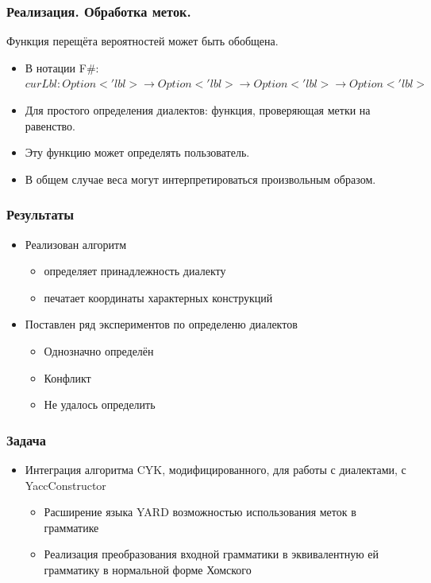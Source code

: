 \documentclass{beamer}
\begin{document}
\begin{frame}
	\transwipe[direction=90]
	\frametitle{Реализация. Обработка меток.}
	Функция перещёта вероятностей может быть обобщена.
	\begin{itemize}
	    \item В нотации F\#: $curLbl: Option<' \! lbl> \rightarrow Option<'\!lbl> \rightarrow Option<'\!lbl> \rightarrow Option<'\!lbl>$
        \item Для простого определения диалектов: функция, проверяющая метки на равенство.
        \item Эту функцию может определять пользователь.
        \item В общем случае веса могут интерпретироваться произвольным образом.
    \end{itemize}
\end{frame}    

\begin{frame}
	\transwipe[direction=90]
	\frametitle{Результаты}
	\begin{itemize}
        \item Реализован алгоритм
        	\begin{itemize}
        	    \item определяет принадлежность диалекту
        	    \item печатает координаты характерных конструкций
    	    \end{itemize}
            \item Поставлен ряд экспериментов по определеню диалектов
        	\begin{itemize}
                \item Однозначно определён
                \item Конфликт
                \item Не удалось определить
            \end{itemize}
    \end{itemize}
\end{frame}    


\author[Ильнур Байгильдин]{}

\begin{frame}
	\transwipe[direction=90]
	\frametitle{Задача}
	\begin{itemize}
	    \item Интеграция алгоритма CYK, модифицированного, для работы с диалектами, с YaccConstructor
    	\begin{itemize}
            \item Расширение языка YARD возможностью использования меток в грамматике
            \item Реализация преобразования входной грамматики в эквивалентную ей грамматику в нормальной форме Хомского
        \end{itemize}
    \end{itemize}
\end{frame}
\end{document}
